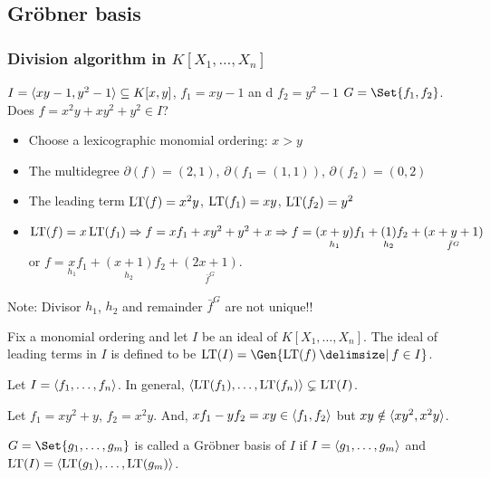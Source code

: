 \subsection{Gr\"{o}bner basis}

\subsubsection{Division algorithm in $K[X_1,\dots,X_n]$}

\begin{example}
  $I = \langle xy-1,y^2-1 \rangle \subseteq K[x,y]$, $f_1 = xy-1$ an
  d $f_2 = y^2-1$ $G=\Set{f_1,f_2}$. Does $f = x^2y+xy^2+y^2 \in I$?
  \begin{itemize}
      \item Choose a lexicographic monomial ordering: $x > y$
      \item The multidegree $\partial(f) = (2,1)$, $\partial(f_1 = (1,1))$,
        $\partial(f_2) = (0,2)$
      \item The leading term $\operatorname{LT}(f) = x^2y$, $\operatorname{LT}(f_1) = xy$, $\operatorname{LT}(f_2) = y^2$
      \item $\operatorname{LT}(f) = x\operatorname{LT}(f_1) \Rightarrow f = xf_1+xy^2+y^2+x \Rightarrow f = \underset{h_1}{(x+y)}f_1+\underset{h_2}{(1)}f_2+\underset{\bar{f}^G}{(x+y+1)}$ or $f = \underset{h_1}{x}f_1+\underset{h_2}{(x+1)}f_2+\underset{\bar{f}^G}{(2x+1)}$.
  \end{itemize}
  Note:  Divisor $h_1$, $h_2$ and remainder $\bar{f}^G$ are not unique!! 
\end{example}

\begin{definition}
  Fix a monomial ordering and let $I$ be an ideal of $K[X_1,\dots,X_n]$.
  The ideal of leading terms in $I$ is defined to be
  $\LT(I) = \Gen{ \LT(f) \given f\in I }$.
\end{definition}

\begin{remark}
  Let $I = \langle f_1,\dots,f_n \rangle$. In general, $\langle\operatorname{LT}(f_1),\dots,\operatorname{LT}(f_n)\rangle
  \subsetneq \operatorname{LT}(I)$.
\end{remark}

\begin{example}
  Let $f_1=xy^2+y$, $f_2=x^2y$. And, $xf_1-yf_2=xy \in \langle f_1,f_2 \rangle$ but
  $xy \notin \langle xy^2, x^2y \rangle$.
\end{example}

\begin{definition}
  $G = \Set{g_1,\dots,g_m}$ is called a Gr\"{o}bner basis of $I$ if
  $I = \langle g_1,\dots,g_m \rangle$ and $\operatorname{LT}(I) = \langle \operatorname{LT}(g_1),\dots,\operatorname{LT}(g_m) \rangle$.
\end{definition}

